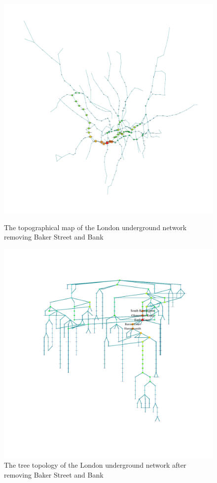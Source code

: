 \documentclass[a4paper,reqno,]{article}
\begin{document}
\begin{figure}[H]
\centering
\begin{minipage}[b]{0.49\textwidth}
\centering
    \captionsetup{width=.9\linewidth}
    \includegraphics[clip, trim=3cm 3cm 3cm 2cm,width=1\textwidth]{images/NW/4_1.pdf}
    \caption{The topographical map of the London underground network removing Baker Street and Bank}\label{fig: 4_1}
\end{minipage}
\begin{minipage}[b]{0.5\textwidth}
\centering
    \captionsetup{width=.9\linewidth}
    \includegraphics[clip, trim=3cm 3cm 2cm 2cm,width=1\textwidth]{images/NW/4_2.pdf}
    \caption{The tree topology of the London underground network after removing Baker Street and Bank}\label{fig: 4_2}
\end{minipage}
\end{figure} 
\end{document}
